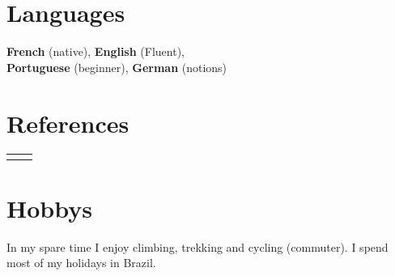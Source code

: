 \documentclass[10pt]{article} %
\begin{document}
\begin{paracol}{2}
\section{Languages}
\textbf{French} (native), \textbf{English} (Fluent), \\
\textbf{Portuguese} (beginner), \textbf{German} (notions)
%
%
\section{References}
%
%
%
%
%
%
%
\begin{supertabular}{rl} %
%
%
%

\end{supertabular}
%
%
%
\section{Hobbys}
In my spare time I enjoy climbing, trekking and cycling (commuter). I
spend most of my holidays in Brazil.%
%
\end{paracol}
%
%
\vspace{-1.5mm}
\huge\centering{}
%
\end{document}

